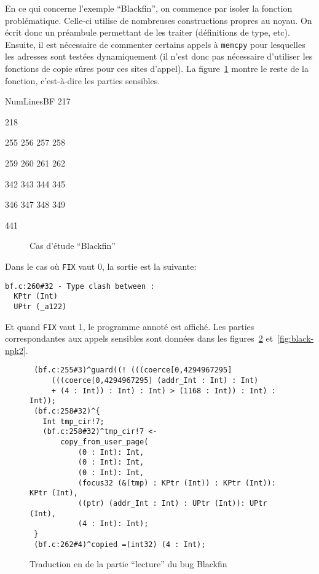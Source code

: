 En ce qui concerne l'exemple \enquote{Blackfin}, on commence par isoler la
fonction problématique. Celle-ci utilise de nombreuses constructions propres au
noyau. On écrit donc un préambule permettant de les traiter (définitions de
type, etc). Ensuite, il est nécessaire de commenter certains appels à
\texttt{memcpy} pour lesquelles les adresses sont testées dynamiquement (il
n'est donc pas nécessaire d'utiliser les fonctions de copie sûres pour ces sites
d'appel). La figure~\ref{fig:blackfin-cas} montre le reste de la fonction,
c'est-à-dire les parties sensibles.

\begin{SaveVerbatim}{NumLinesBF}
217

218

255
256
257
258

259
260
261
262

342
343
344
345

346
347
348
349

441
\end{SaveVerbatim}

\begin{figure}
\begin{minipage}{1cm}
\end{minipage}
\begin{minipage}{0.93\linewidth}
\end{minipage}
\caption{Cas d'étude \enquote{Blackfin}}
\label{fig:blackfin-cas}
\end{figure}

Dans le cas où \texttt{FIX} vaut 0, la sortie est la suivante:

\begin{Verbatim}
bf.c:260#32 - Type clash between :
  KPtr (Int)
  UPtr (_a122)
\end{Verbatim}

Et quand \texttt{FIX} vaut 1, le programme annoté est affiché. Les parties
correspondantes aux appels sensibles sont données dans les
figures~\ref{fig:black-npk1} et~\ref{fig:black-npk2}.

\begin{figure}[h]
\begin{Verbatim}
 (bf.c:255#3)^guard((! (((coerce[0,4294967295]
     (((coerce[0,4294967295] (addr_Int : Int) : Int)
     + (4 : Int)) : Int) : Int) > (1168 : Int)) : Int) : Int));
 (bf.c:258#32)^{
   Int tmp_cir!7;
   (bf.c:258#32)^tmp_cir!7 <-
       copy_from_user_page(
           (0 : Int): Int,
           (0 : Int): Int,
           (0 : Int): Int,
           (focus32 (&(tmp) : KPtr (Int)) : KPtr (Int)): KPtr (Int),
           ((ptr) (addr_Int : Int) : UPtr (Int)): UPtr (Int),
           (4 : Int): Int);
 }
 (bf.c:262#4)^copied =(int32) (4 : Int);
\end{Verbatim}
\caption{Traduction en \newspeak de la partie \enquote{lecture} du bug Blackfin}
\label{fig:black-npk1}
\end{figure}

